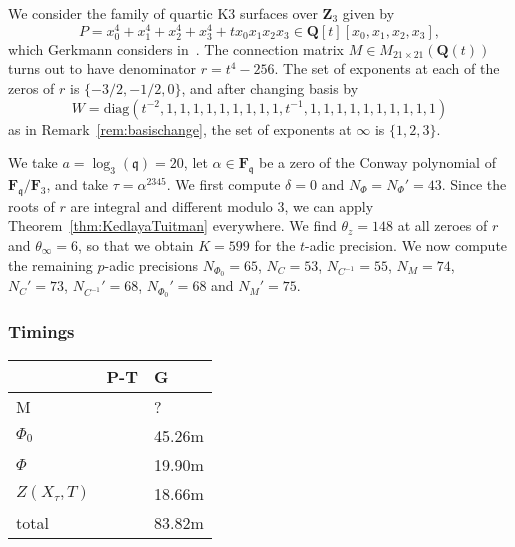 \documentclass[a4paper,11pt]{article}
\numberwithin{equation}{section}
\newcommand{\ZZ}{\mathbf{Z}} %
\newcommand{\QQ}{\mathbf{Q}} %
\newcommand{\FF}{\mathbf{F}} %
\theoremstyle{definition}
\begin{document}
We consider the family of quartic K3 surfaces over $\ZZ_3$ given by
\begin{equation*}
P=x_0^4 + x_1^4 + x_2^4 + x_3^4 + t x_0 x_1 x_2 x_3 \in \QQ[t][x_0,x_1,x_2,x_3],
\end{equation*}
which Gerkmann considers in~\citep[\S 7.5]{Gerkmann2007}. The connection matrix 
$M \in M_{21 \times 21}(\QQ(t))$ turns out to have denominator 
$r=t^4-256$. The set of exponents at each of the zeros of $r$ is $\{-3/2,-1/2,0\}$, 
and after changing basis by
\[
W=\mbox{diag}(t^{-2},1,1,1,1,1,1,1,1,1,t^{-1},1,1,1,1,1,1,1,1,1,1)
\] 
as in Remark~\ref{rem:basischange}, the set of exponents  at $\infty$ is 
$\{1,2,3\}$. 

We take $a=\log_3(\mathfrak{q})=20$, let $\alpha \in \FF_{\mathfrak{q}}$
be a zero of the Conway polynomial of $\FF_{\mathfrak{q}}/\FF_{3}$, and take
$\tau=\alpha^{2345}$.  We first compute $\delta=0$ and $N_{\Phi}=N_{\Phi}'=43$.  
Since the roots of $r$ are integral and different modulo $3$, we can apply 
Theorem~\ref{thm:KedlayaTuitman} everywhere. We find $\theta_z=148$ at all zeroes 
of $r$ and $\theta_{\infty}=6$, so that we
obtain $K=599$ for the $t$-adic precision. We now compute the remaining $p$-adic 
precisions $N_{\Phi_0}=65$, $N_C=53$, $N_{C^{-1}}=55$, $N_M=74$, 
$N_C'=73$, $N_{C^{-1}}'=68$, $N_{\Phi_0}'=68$ and $N_M'=75$.

\subsubsection{Timings}

\begin{tabular}{l|l|l}
                 & \mbox{P-T} & \mbox{G}          \\
\hline                 
M                &              &  ?              \\
\hline                 
$\Phi_0$         &              & 45.26m          \\
\hline                 
$\Phi$           &              & 19.90m          \\
\hline
$Z(X_{\tau},T)$  &              & 18.66m          \\
\hline
total            &              & 83.82m          \\
\end{tabular}
\end{document}
